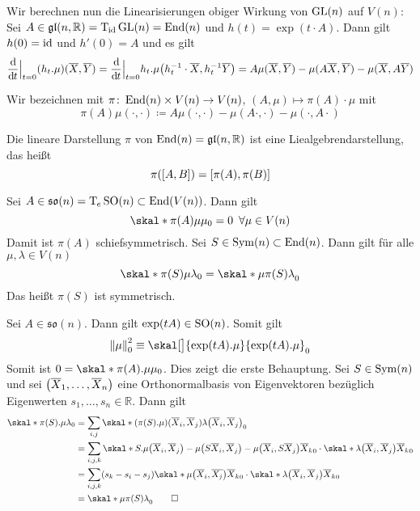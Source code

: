 Wir berechnen nun die Linearisierungen obiger Wirkung von $\GL(n)$ auf $V(n)$:
Sei $A \in \mathfrak{gl}(n,\mathbb{R}) = \Tmap_{\id} \GL(n) = \End(n)$ und $h(t)=\exp(t \cdot A)$.
Dann gilt $h(0)= {\id}$ und $h'(0) =A$ und es gilt
\[
	\diffd{}{t}\Big|_{t=0} (h_t.\mu)(\overline{X},\overline{Y}) = \diffd{}{t}\Big|_{t=0} h_t.\mu \enbrace*{h_t^{-1} \cdot \overline{X}, h_t^{-1} \overline{Y}}
	= A \mu(\overline{X},\overline{Y}) - \mu(A \overline{X}, \overline{Y}) - \mu(\overline{X}, A \overline{Y})
\]

\begin{definition}
	Wir bezeichnen mit $\pi \colon \End(n) \times V(n) \to V(n)$, $(A,\mu) \mapsto \pi(A)\cdot \mu$ mit 
	\[
		\pi(A)\mu(\cdot ,\cdot ) \coloneqq A \mu(\cdot ,\cdot ) - \mu (A \cdot ,\cdot ) - \mu(\cdot ,A \cdot )
	\]
\end{definition}

Die lineare Darstellung $\pi$ von $\End(n) = \mathfrak{gl}(n,\mathbb{R})$ ist eine Liealgebrendarstellung, das heißt
\[
	\pi \enbrace*{\benbrace*{A,B}} = \benbrace*{\pi(A), \pi(B)}
\]

\begin{lemma}
	Sei $A \in \mathfrak{so}(n) = \Tmap_e \SO(n) \subset \End(V(n))$.
	Dann gilt 
	\[
		\skal*{\pi(A) \mu}{\mu}_0 = 0 \enspace \forall \mu \in V(n)
	\]
	Damit ist $\pi(A)$ schiefsymmetrisch. Sei $S \in  \Sym(n) \subset \End(n)$.
	Dann gilt für alle $\mu,\lambda \in V(n)$
	\[
		\skal*{\pi(S) \mu}{\lambda}_0 = \skal*{\mu}{\pi(S)\lambda}_0
	\]
	Das heißt $\pi(S)$ ist symmetrisch.
\end{lemma}
\begin{beweis}
	Sei $A \in \mathfrak{so}(n)$.
	Dann gilt $\exp(t A) \in \SO(n)$.
	Somit gilt 
	\[
		\norm*{\mu}_0^2 \equiv \skal[\big]{\exp(t A). \mu}{ \exp(tA).\mu}_0
	\]
	Somit ist $0= \skal*{\pi(A).\mu}{\mu}_0$.
	Dies zeigt die erste Behauptung.
	Sei $S \in \Sym(n)$ und sei $\enbrace*{\overline{X}_1, \ldots , \overline{X}_n}$ eine Orthonormalbasis von Eigenvektoren bezüglich Eigenwerten $s_1, \ldots, s_n \in \mathbb{R}$.
	Dann gilt
	\begin{align}
		\skal*{\pi(S).\mu}{\lambda}_0 &= \sum_{i,j} \skal*{\enbrace*{\pi(S).\mu}(\overline{X}_i, \overline{X}_j)}{\lambda \enbrace*{\overline{X}_i, \overline{X}_j}}_0 \\
		&= \sum_{i,j,k} \skal*{S.\mu \enbrace*{\overline{X}_i, \overline{X}_j} - \mu \enbrace*{S \overline{X}_i, \overline{X}_j} - \mu \enbrace*{\overline{X}_i, S \overline{X}_j}}{\overline{X}_k}_0 \cdot \skal*{\lambda \enbrace*{\overline{X}_i, \overline{X}_j}}{\overline{X}_k}_0 \\
		&= \sum_{i,j,k} \enbrace*{s_k - s_i - s_j} \skal*{\mu \enbrace*{\overline{X}_i, \overline{X_j}}}{\overline{X}_k}_0 \cdot \skal*{\lambda \enbrace*{\overline{X}_i, \overline{X}_j}}{\overline{X}_k}_0 \\
		&= \skal*{\mu}{\pi(S) \lambda}_0 \qedhere
	\end{align}
\end{beweis}


